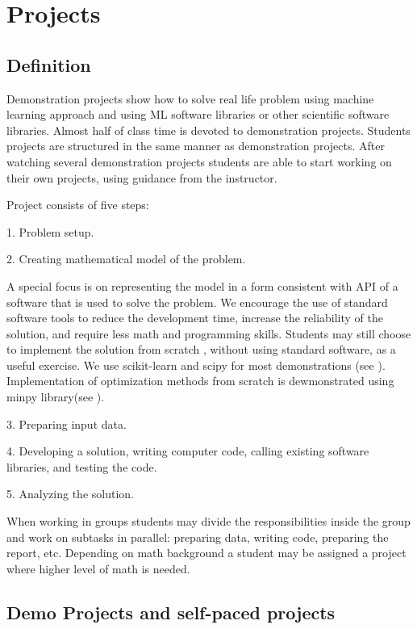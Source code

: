 \documentclass{article} %
\begin{document}
    \section{Projects} %
   \subsection{Definition} %
	Demonstration projects show how to solve real life problem using machine learning approach and using ML software libraries or other scientific software libraries. Almost half of class time is devoted to demonstration projects. Students projects are structured in the same manner as demonstration projects. After watching several demonstration projects students are able to start working on their own projects, using guidance from the instructor. 
	
	Project consists of five steps: 
	
	1. Problem setup. 
	
	2. Creating mathematical model of the problem.
	
	A special focus is on representing the model in a form consistent with API of a software that is used to solve the problem.  We encourage the use of standard software tools to reduce the development time, increase the reliability of the solution, and require less math and programming skills.
	Students  may still choose to implement the solution from scratch , without using standard software, as a useful exercise. We use scikit-learn and scipy for most demonstrations (see \cite{scipy,sklearn1}). Implementation of optimization methods from scratch is dewmonstrated using minpy library(see \cite{MP}).
	
	3. Preparing input data.  
	
	4. Developing a solution, writing computer code, calling existing software libraries, and testing  the code.
	
	
	5. Analyzing the solution. 
	
	When working in groups students may divide the responsibilities inside the group and work on subtasks in parallel: preparing data, writing code, preparing the report, etc. Depending on math background a student may be assigned a project where higher level of math is needed.

   \subsection{Demo Projects and self-paced projects} %
\end{document}

